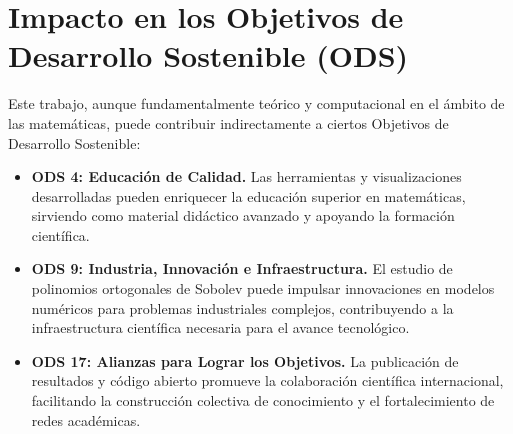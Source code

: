 \section{Impacto en los Objetivos de Desarrollo Sostenible (ODS)}
Este trabajo, aunque fundamentalmente teórico y computacional en el ámbito de las matemáticas, puede contribuir indirectamente a ciertos Objetivos de Desarrollo Sostenible\cite{UN2015SDG}:

\begin{itemize}
  \item \textbf{ODS 4: Educación de Calidad.}
        Las herramientas y visualizaciones desarrolladas pueden enriquecer la educación superior en matemáticas, sirviendo como material didáctico avanzado y apoyando la formación científica\cite{UN2015SDG4}.

  \item \textbf{ODS 9: Industria, Innovación e Infraestructura.}
        El estudio de polinomios ortogonales de Sobolev puede impulsar innovaciones en modelos numéricos para problemas industriales complejos, contribuyendo a la infraestructura científica necesaria para el avance tecnológico\cite{UN2015SDG9}.

  \item \textbf{ODS 17: Alianzas para Lograr los Objetivos.}
        La publicación de resultados y código abierto promueve la colaboración científica internacional, facilitando la construcción colectiva de conocimiento y el fortalecimiento de redes académicas\cite{UN2015SDG17}.
\end{itemize}

